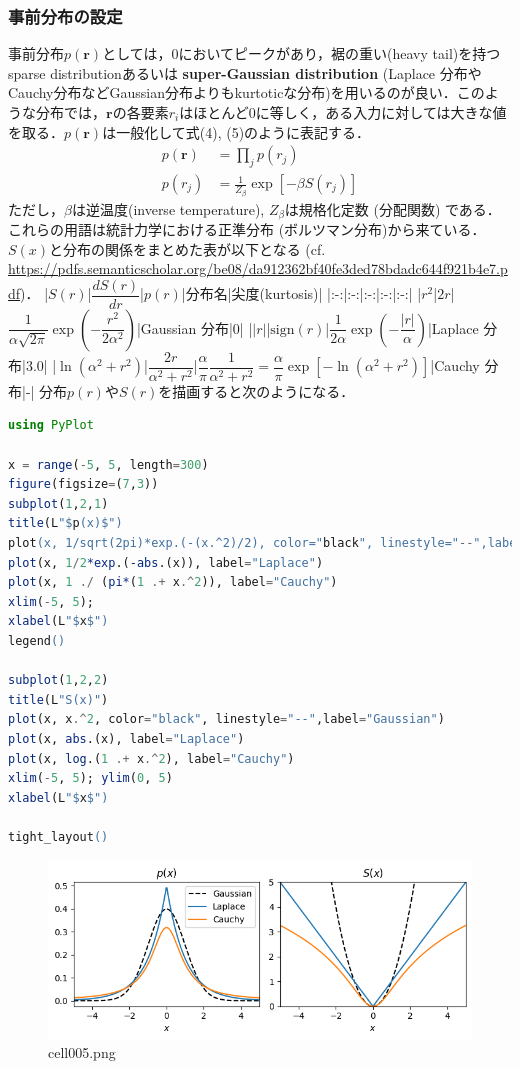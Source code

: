 \subsubsection{事前分布の設定}
事前分布$p(\mathbf{r})$としては，0においてピークがあり，裾の重い(heavy tail)を持つsparse distributionあるいは \textbf{super-Gaussian distribution} (Laplace 分布やCauchy分布などGaussian分布よりもkurtoticな分布)を用いるのが良い．このような分布では，$\mathbf{r}$の各要素$r_i$はほとんど0に等しく，ある入力に対しては大きな値を取る．$p(\mathbf{r})$は一般化して式(4), (5)のように表記する．
\begin{align}
p(\mathbf{r})&=\prod_j p(r_j)\\
p(r_j)&=\frac{1}{Z_{\beta}}\exp \left[-\beta S(r_j)\right]
\end{align}
ただし，$\beta$は逆温度(inverse temperature), $Z_{\beta}$は規格化定数 (分配関数) である．これらの用語は統計力学における正準分布 (ボルツマン分布)から来ている．$S(x)$と分布の関係をまとめた表が以下となる (cf. \url{https://pdfs.semanticscholar.org/be08/da912362bf40fe3ded78bdadc644f921b4e7.pdf})．
|$S(r)$|$\dfrac{dS(r)}{dr}$|$p(r)$|分布名|尖度(kurtosis)|
|:-:|:-:|:-:|:-:|:-:|
|$r^2$|$2r$|$\dfrac{1}{\alpha \sqrt{2\pi}}\exp\left(-\dfrac{r^2}{2\alpha^2}\right)$|Gaussian 分布|0|
|$\vert r\vert$|$\text{sign}(r)$|$\dfrac{1}{2\alpha}\exp\left(-\dfrac{\vert r\vert}{\alpha}\right)$|Laplace 分布|3.0|
|$\ln (\alpha^2+r^2)$|$\dfrac{2r}{\alpha^2+r^2}$|$\dfrac{\alpha}{\pi}\dfrac{1}{\alpha^2+r^2}=\dfrac{\alpha}{\pi}\exp[-\ln (\alpha^2+r^2)]$|Cauchy 分布|-|
分布$p(r)$や$S(r)$を描画すると次のようになる．
\begin{lstlisting}[language=julia]
using PyPlot

x = range(-5, 5, length=300)
figure(figsize=(7,3))
subplot(1,2,1)
title(L"$p(x)$")
plot(x, 1/sqrt(2pi)*exp.(-(x.^2)/2), color="black", linestyle="--",label="Gaussian")
plot(x, 1/2*exp.(-abs.(x)), label="Laplace")
plot(x, 1 ./ (pi*(1 .+ x.^2)), label="Cauchy")
xlim(-5, 5); 
xlabel(L"$x$")
legend()

subplot(1,2,2)
title(L"S(x)")
plot(x, x.^2, color="black", linestyle="--",label="Gaussian")
plot(x, abs.(x), label="Laplace")
plot(x, log.(1 .+ x.^2), label="Cauchy")
xlim(-5, 5); ylim(0, 5)
xlabel(L"$x$")

tight_layout()
\end{lstlisting}
\begin{figure}[ht]
	\centering
	\includegraphics[scale=0.8, max width=\linewidth]{./fig/energy-based-model/sparse-coding/cell005.png}
	\caption{cell005.png}
	\label{cell005.png}
\end{figure}
